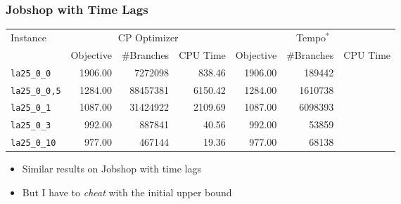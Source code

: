 \begin{frame}
\frametitle{Jobshop with Time Lags}


\vfill

\begin{footnotesize}
\begin{tabular}{lrrrrrr}
\toprule
\multirow{2}{*}{Instance}&  \multicolumn{3}{c}{CP Optimizer} & \multicolumn{3}{c}{Tempo$^*$}\\
\cmidrule(rr){2-4}\cmidrule(rr){5-7}
& \multicolumn{1}{c}{Objective} & \multicolumn{1}{c}{\#Branches} & \multicolumn{1}{c}{CPU Time} 
& \multicolumn{1}{c}{Objective} & \multicolumn{1}{c}{\#Branches} & \multicolumn{1}{c}{CPU Time} \\
\midrule

\texttt{la25\_0\_0} & 1906.00 & 7272098 & \cellcolor{red!50}838.46 & 1906.00 & 189442 & \cellcolor{green!50}{26.31}\\
\texttt{la25\_0\_0,5} & 1284.00 & 88457381 & \cellcolor{red!50}6150.42 & 1284.00 & 1610738 & \cellcolor{green!50}{272.01}\\
\texttt{la25\_0\_1} & 1087.00 & 31424922 & \cellcolor{red!50}2109.69 & 1087.00 & 6098393 & \cellcolor{green!50}{1173.10}\\
\texttt{la25\_0\_3} & 992.00 & 887841 & \cellcolor{red!50}40.56 & 992.00 & 53859 & \cellcolor{green!50}{6.53}\\
\texttt{la25\_0\_10} & 977.00 & 467144 & \cellcolor{red!50}19.36 & 977.00 & 68138 & \cellcolor{green!50}{9.51}\\
\bottomrule
\end{tabular}
\end{footnotesize}

\vfill

\begin{itemize}
  \item Similar results on Jobshop with time lags

  \vfill\pause
  \item But I have to \emph{cheat} with the initial upper bound
\end{itemize}

\vfill

\end{frame}


